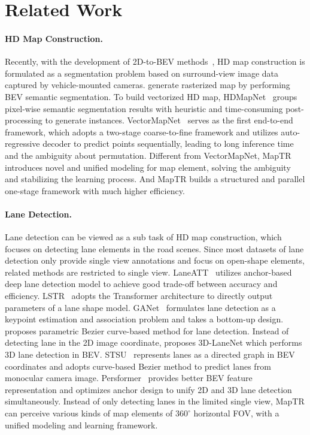 \documentclass{article} \usepackage{iclr2023_conference,times}
\begin{document}
\section{Related Work}
\paragraph{HD Map Construction.}
Recently, with the development of 2D-to-BEV methods~\citep{Ma2022VisionCentricBP},
HD map construction is formulated as a segmentation problem based on  surround-view image data captured by vehicle-mounted cameras. \cite{gkt,cvt,fiery,bevformer,lss,polarbev} generate rasterized map by performing BEV semantic segmentation.
To build vectorized HD map, HDMapNet~\citep{hdmapnet}  groups pixel-wise semantic segmentation results with heuristic and time-consuming post-processing to generate instances. 
VectorMapNet~\citep{vectormapnet} serves as the first end-to-end framework, which adopts a two-stage coarse-to-fine framework and utilizes auto-regressive decoder to predict points sequentially, leading to long inference time and the ambiguity about permutation.
Different from VectorMapNet, MapTR introduces novel and unified modeling for map element, solving the ambiguity and stabilizing the learning process. And MapTR builds a structured and parallel one-stage framework with much higher efficiency. 




\paragraph{Lane Detection.}
Lane detection can be viewed as a sub task of HD map construction, which focuses on detecting lane elements in the road scenes. Since most datasets of lane detection only provide single view annotations and focus on open-shape elements, related methods are restricted to single view.
LaneATT~\citep{tabelini2021keep} utilizes anchor-based deep lane detection model to achieve good trade-off between accuracy and efficiency. LSTR~\citep{lstr} adopts the Transformer architecture to directly output parameters of a lane shape model. GANet~\citep{wang2022keypoint} formulates lane detection as a keypoint estimation and association problem and takes a bottom-up design.  \cite{feng2022rethinking} proposes parametric Bezier curve-based method for lane detection. Instead of detecting lane in the 2D image coordinate, \cite{garnett20193d} proposes 3D-LaneNet which performs 3D lane detection in BEV. STSU~\citep{can2021structured} represents lanes as a directed graph in BEV coordinates and adopts curve-based Bezier method to predict lanes from monocular camera image. Persformer~\citep{chen2022persformer} provides better BEV feature representation and optimizes anchor design to unify 2D and 3D lane detection simultaneously.
Instead of only detecting lanes in the limited single view,  MapTR can perceive various kinds of map elements of $360^\circ$ horizontal FOV, with a unified modeling and learning framework.
\end{document}
